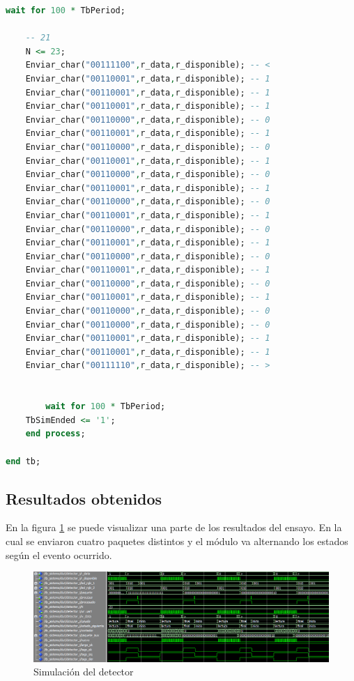 \begin{lstlisting}[language = vhdl,caption=Testbench del módulo detector,label={lst:test_detector}]
	wait for 100 * TbPeriod;

	-- 21
	N <= 23; 	
	Enviar_char("00111100",r_data,r_disponible); -- < 	
	Enviar_char("00110001",r_data,r_disponible); -- 1 	
	Enviar_char("00110001",r_data,r_disponible); -- 1
 	Enviar_char("00110001",r_data,r_disponible); -- 1 	
	Enviar_char("00110000",r_data,r_disponible); -- 0
	Enviar_char("00110001",r_data,r_disponible); -- 1 	
	Enviar_char("00110000",r_data,r_disponible); -- 0
	Enviar_char("00110001",r_data,r_disponible); -- 1 	
	Enviar_char("00110000",r_data,r_disponible); -- 0
	Enviar_char("00110001",r_data,r_disponible); -- 1 	
	Enviar_char("00110000",r_data,r_disponible); -- 0
	Enviar_char("00110001",r_data,r_disponible); -- 1 	
	Enviar_char("00110000",r_data,r_disponible); -- 0
	Enviar_char("00110001",r_data,r_disponible); -- 1 	
	Enviar_char("00110000",r_data,r_disponible); -- 0
	Enviar_char("00110001",r_data,r_disponible); -- 1 	
	Enviar_char("00110000",r_data,r_disponible); -- 0
	Enviar_char("00110001",r_data,r_disponible); -- 1 	
	Enviar_char("00110000",r_data,r_disponible); -- 0
	Enviar_char("00110000",r_data,r_disponible); -- 0 	
	Enviar_char("00110001",r_data,r_disponible); -- 1
	Enviar_char("00110001",r_data,r_disponible); -- 1 	
	Enviar_char("00111110",r_data,r_disponible); -- >


        wait for 100 * TbPeriod;
	TbSimEnded <= '1';
    end process;
	
end tb;
		\end{lstlisting}
			
	\subsection{Resultados obtenidos}
				
		En la figura \ref{fig:Test_Detector} se puede visualizar una parte de los resultados del ensayo. En la cual se enviaron cuatro paquetes distintos y el módulo va alternando los estados según el evento ocurrido. 
		
		\begin{figure}[h]
		\centering
		\includegraphics[scale=0.5]{./Figures/Test/Detector}
			\caption{Simulación del detector}
			\label{fig:Test_Detector}
		\end{figure}

